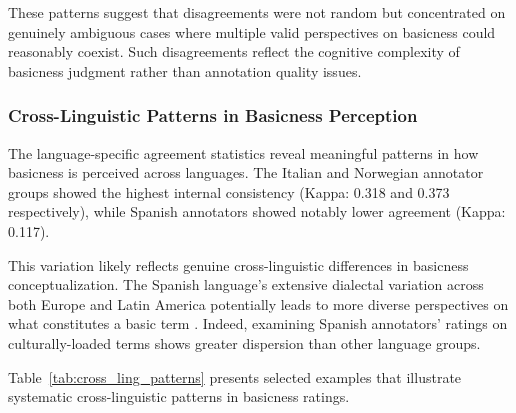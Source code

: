 \documentclass[preprint,12pt,authoryear]{elsarticle}
\begin{document}
These patterns suggest that disagreements were not random but concentrated on genuinely ambiguous cases where multiple valid perspectives on basicness could reasonably coexist. Such disagreements reflect the cognitive complexity of basicness judgment rather than annotation quality issues.

\subsubsection{Cross-Linguistic Patterns in Basicness Perception}

The language-specific agreement statistics reveal meaningful patterns in how basicness is perceived across languages. The Italian and Norwegian annotator groups showed the highest internal consistency (Kappa: 0.318 and 0.373 respectively), while Spanish annotators showed notably lower agreement (Kappa: 0.117).

This variation likely reflects genuine cross-linguistic differences in basicness conceptualization. The Spanish language's extensive dialectal variation across both Europe and Latin America potentially leads to more diverse perspectives on what constitutes a basic term \cite{lipski_geographical_2012,tellez_regionalized_2023}. Indeed, examining Spanish annotators' ratings on culturally-loaded terms shows greater dispersion than other language groups.

Table~\ref{tab:cross_ling_patterns} presents selected examples that illustrate systematic cross-linguistic patterns in basicness ratings.

\end{document}
